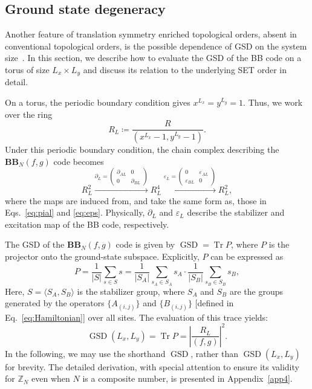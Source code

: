 \documentclass[aps,prb,english,superscriptaddress,twocolumn,tightenlines,showpacs,longbibliography,floatfix,amsfonts]{revtex4-2}
\newcommand{\tr}{\operatorname{Tr}}
\newcommand{\eps}{\varepsilon}
\newcommand{\gsd}{\operatorname{GSD}}
\begin{document}
\subsection{Ground state degeneracy}
\label{sec3c}
Another feature of translation symmetry enriched topological orders, absent in conventional topological orders, is the possible dependence of GSD on the system size~\cite{Watanabe2023, Chen2025}. In this section, we describe how to evaluate the GSD of the BB code on a torus of size $L_x\times L_y$ and discuss its relation to the underlying SET order in detail.

On a torus, the periodic boundary condition gives $x^{L_x}=y^{L_y}=1$. Thus, we work over the ring
\begin{equation}
    R_L \coloneqq\frac{R}{(x^{L_x}-1,y^{L_y}-1)}.
\end{equation}
Under this periodic boundary condition, the chain complex describing the $\mathbf{BB}_N(f,g)$ code becomes
\begin{equation}
R_{L}^2\xrightarrow{\partial_{L}=\left(\begin{array}{cc}
\partial_{AL} & 0\\
0 & \partial_{BL}
\end{array}\right)}R_{L}^{4}\xrightarrow{\varepsilon_L=\left(\begin{array}{cc}
0 & \varepsilon_{AL}\\
\varepsilon_{BL} & 0
\end{array}\right)}R_{L}^2,\label{eq:ccpbc}
\end{equation} 
where the maps are induced from, and take the same form as, those in Eqs.~\eqref{eq:pial} and \eqref{eq:eps}. Physically, $\partial_L$ and $\eps_L$ describe the stabilizer and excitation map of the BB code, respectively.

The GSD of the $\mathbf{BB}_{N}(f,g)$ code is given by $\gsd =\tr P$, where $P$ is the projector onto the ground-state subspace. Explicitly, $P$ can be expressed as
\begin{equation}
    P = \frac{1}{|S|}\sum_{s\in S}s
    =\frac{1}{|S_A|}\sum_{s_A\in S_A}s_A\cdot\frac{1}{|S_B|}\sum_{s_B\in S_B}s_B,\label{eq:PaPb}
\end{equation}
Here, $S = \langle S_A, S_B \rangle$ is the stabilizer group, where $S_A$ and $S_B$ are the groups generated by the operators $\{A_{(i,j)}\}$ and $\{B_{(i,j)}\}$ [defined in Eq.~\eqref{eq:Hamiltonian}] over all sites. The evaluation of this trace yields:
\begin{equation}
    \gsd(L_x,L_y) =\tr P =\left|\frac{R_{L}}{\left(f,g\right)}\right|^{2}.\label{eq:gsd1}
\end{equation}
In the following, we may use the shorthand $\gsd$, rather than $\gsd(L_x,L_y)$ for brevity. The detailed derivation, with special attention to ensure its validity for $\mathbb{Z}_{N}$ even when $N$ is a composite number, is presented in Appendix~\ref{app4}.
\end{document}
